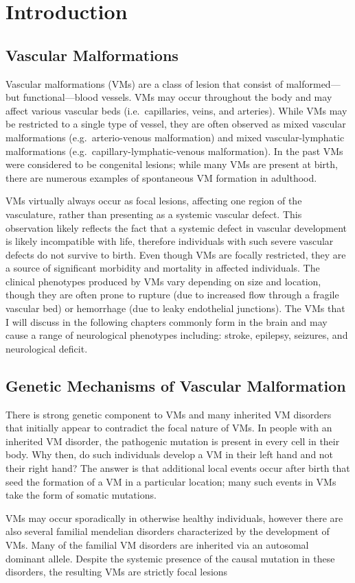 \chapter{Introduction}
\label{chap:intro}

\clearpage

\section{Vascular Malformations}
Vascular malformations (VMs) are a class of lesion that consist of malformed---but functional---blood vessels. VMs may occur throughout the body and may affect various vascular beds (i.e.~capillaries, veins, and arteries). While VMs may be restricted to a single type of vessel, they are often observed as mixed vascular malformations (e.g.~arterio-venous malformation) and mixed vascular-lymphatic malformations (e.g.~capillary-lymphatic-venous malformation). In the past VMs were considered to be congenital lesions; while many VMs are present at birth, there are numerous examples of spontaneous  VM formation in adulthood. 

VMs virtually always occur as focal lesions, affecting one region of the vasculature, rather than presenting as a systemic vascular defect. This observation likely reflects the fact that a systemic defect in vascular development is likely incompatible with life, therefore individuals with such severe vascular defects do not survive to birth. Even though VMs are focally restricted, they are a source of significant morbidity and mortality in affected individuals. The clinical phenotypes produced by VMs vary depending on size and location, though they are often prone to rupture (due to increased flow through a fragile vascular bed) or hemorrhage (due to leaky endothelial junctions). The VMs that I will discuss in the following chapters commonly form in the brain and may cause a range of neurological phenotypes including: stroke, epilepsy, seizures, and neurological deficit.

\section{Genetic Mechanisms of Vascular Malformation}
There is strong genetic component to VMs and many inherited VM disorders that initially appear to contradict the focal nature of VMs. In people with an inherited VM disorder, the pathogenic mutation is present in every cell in their body. Why then, do such individuals develop a VM in their left hand and not their right hand? The answer is that additional local events occur after birth that seed the formation of a VM in a particular location; many such events in VMs take the form of somatic mutations. 

VMs may occur sporadically in otherwise healthy individuals, however there are also several familial mendelian disorders characterized by the development of VMs. Many of the familial VM disorders are inherited via an autosomal dominant allele. Despite the systemic presence of the causal mutation in these disorders, the resulting VMs are strictly focal lesions
